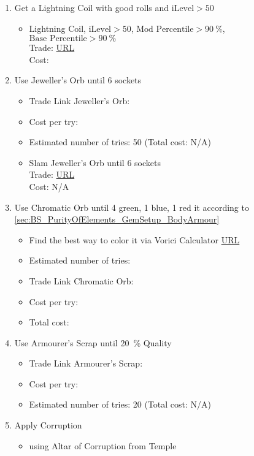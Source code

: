 \begin{enumerate}
	\item Get a Lightning Coil with good rolls and $\text{iLevel} > 50$
	\begin{itemize}
		\item Lightning Coil, $\text{iLevel} > 50$, $\text{Mod Percentile} > \SI{90}{\percent}$, $\text{Base Percentile} > \SI{90}{\percent}$\\
		Trade: \url{URL}\\
		Cost: 
	\end{itemize}
	\item Use Jeweller's Orb until 6 sockets
	\begin{itemize}
		\item Trade Link Jeweller's Orb:
		\item Cost per try:
		\item Estimated number of tries: 50 \cite{poewiki:1390489} (Total cost: N/A)
	\end{itemize}
	\begin{itemize}
		\item Slam Jeweller's Orb until 6 sockets\\
			Trade: \url{URL}\\
			Cost: N/A
	\end{itemize}
	\item Use Chromatic Orb until 4 green, 1 blue, 1 red it according to \cref{sec:BS_PurityOfElements_GemSetup_BodyArmour}
	\begin{itemize}
		\item Find the best way to color it via Vorici Calculator \url{URL}
		\item Estimated number of tries:
		\item Trade Link Chromatic Orb:
		\item Cost per try:
		\item Total cost:
	\end{itemize}
	\item Use Armourer's Scrap until \SI{20}{\percent} Quality
	\begin{itemize}
		\item Trade Link Armourer's Scrap:
		\item Cost per try:
		\item Estimated number of tries: 20 (Total cost: N/A)
	\end{itemize}
	\item Apply Corruption
	\begin{itemize}
		\item using Altar of Corruption from Temple

\end{itemize}
\end{enumerate}
